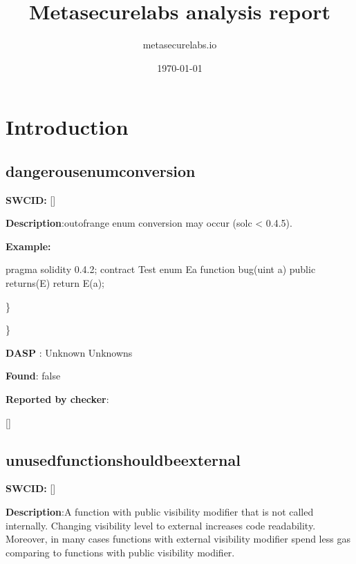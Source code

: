 \documentclass{article}
\title{Metasecurelabs analysis report}
\author{metasecurelabs.io }
\date{\today}
\begin{document}
 

\maketitle 

\section{Introduction} 
\subsection{dangerous{\textunderscore}enum{\textunderscore}conversion} 
\textbf{SWC{\textunderscore}ID:} []

\textbf{Description}:out{\textendash}of{\textendash}range enum conversion may occur (solc < 0.4.5).


\textbf{Example:} 
\begin{ffcode} 

pragma solidity 0.4.2;
contract Test{
  enum E{a}
  function bug(uint a) public returns(E){
        return E(a);
    }
}

\end{ffcode} 
\} 

\} 

\textbf{DASP} : Unknown Unknowns

\textbf{Found}: false

\textbf{Reported by checker}: 
\begin{ffcode} 

[]
\end{ffcode} 
\subsection{unused{\textunderscore}function{\textunderscore}should{\textunderscore}be{\textunderscore}external} 
\textbf{SWC{\textunderscore}ID:} []

\textbf{Description}:A function with public visibility modifier that is not called internally. Changing visibility level to external increases code readability. Moreover, in many cases functions with external visibility modifier spend less gas comparing to functions with public visibility modifier.
\end{document}
